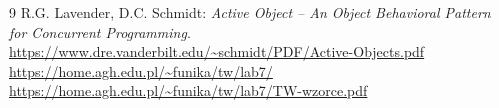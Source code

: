 \documentclass[11pt,a4paper]{article}
\begin{document}
\begin{thebibliography}{9}
     R.G. Lavender, D.C. Schmidt: \textit{Active Object -- An Object Behavioral Pattern for Concurrent Programming}. \url{https://www.dre.vanderbilt.edu/~schmidt/PDF/Active-Objects.pdf}
     \url{https://home.agh.edu.pl/~funika/tw/lab7/}
     \url{https://home.agh.edu.pl/~funika/tw/lab7/TW-wzorce.pdf}
\end{thebibliography}
\end{document}
